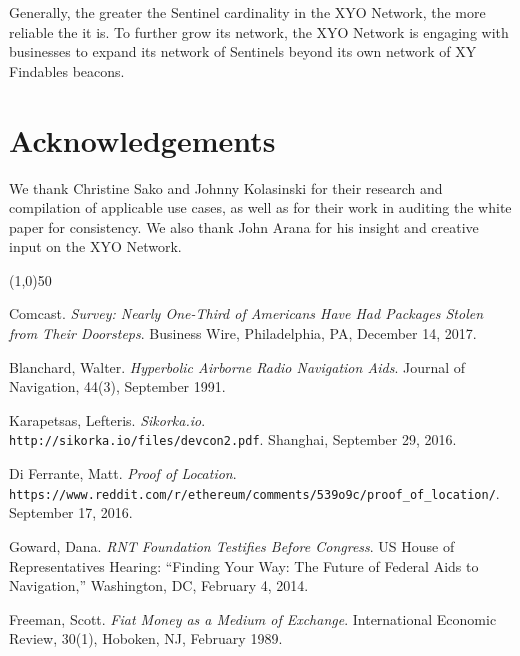 \documentclass{article}
\begin{document}
Generally, the greater the Sentinel cardinality in the XYO Network, the more reliable the it is. To further grow its network, the XYO Network is engaging with businesses to expand its network of Sentinels beyond its own network of XY Findables beacons.

\section {Acknowledgements}

We thank Christine Sako and Johnny Kolasinski for their research and compilation of applicable use cases, as well as for their work in auditing the white paper for consistency. We also thank John Arana for his insight and creative input on the XYO Network.


\begin{center}
\line(1,0){50}
\end{center}



\begin{thebibliography}{9}

Comcast.
\textit{Survey: Nearly One-Third of Americans Have Had Packages Stolen from Their Doorsteps}.
Business Wire, Philadelphia, PA, December 14, 2017.

Blanchard, Walter.
\textit{Hyperbolic Airborne Radio Navigation Aids}.
Journal of Navigation, 44(3), September 1991.

Karapetsas, Lefteris.
\textit{Sikorka.io}.
\\\texttt{http://sikorka.io/files/devcon2.pdf}.
Shanghai, September 29, 2016.

Di Ferrante, Matt.
\textit{Proof of Location}.
\\\texttt{https://www.reddit.com/r/ethereum/comments/539o9c/proof\_of\_location/}.
September 17, 2016.

Goward, Dana.
\textit{RNT Foundation Testifies Before Congress}.
US House of Representatives Hearing: ``Finding Your Way: The Future of Federal Aids to Navigation,'' Washington, DC, February 4, 2014.

Freeman, Scott.
\textit{Fiat Money as a Medium of Exchange}.
International Economic Review, 30(1), Hoboken, NJ, February 1989.
\end{thebibliography}

\clearpage

\printglossaries

\end{document}
